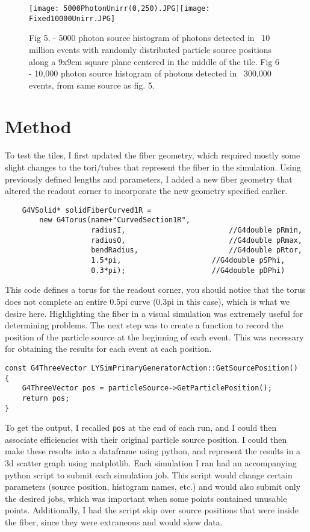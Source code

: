 \documentclass[11pt,twoside,a4paper,dn,final]{cms-tdr}
\begin{document}
\begin{figure}[h!]
  \begin{center}
    \texttt{[image: 5000PhotonUnirr(0,250).JPG]}\hspace{1cm}\texttt{[image: Fixed10000Unirr.JPG]}
    \hspace{1cm}
    \caption{Fig 5. - 5000 photon source histogram of photons detected in ~10 million events with randomly distributed particle source positions along a 9x9cm square plane centered in the middle of the tile.  Fig 6 - 10,000 photon source histogram of photons detected in ~300,000 events, from same source as fig. 5.}
    \label{fig:5,6}
  \end{center}
\end{figure}


\section{Method}
	To test the tiles, I first updated the fiber geometry, which required mostly some slight changes to the tori/tubes that represent the fiber in the simulation. Using previously defined lengths and parameters, I added a new fiber geometry that altered the readout corner to incorporate the new geometry specified earlier. 
\begin{verbatim}
	G4VSolid* solidFiberCurved1R = 
        new G4Torus(name+"CurvedSection1R",
                    radiusI,                        //G4double pRmin,
                    radiusO,                        //G4double pRmax,
                    bendRadius,                     //G4double pRtor,
                    1.5*pi,       	            //G4double pSPhi,
                    0.3*pi);      	            //G4double pDPhi)
\end{verbatim}
This code defines a torus for the readout corner, you should notice that the torus does not complete an entire 0.5pi curve (0.3pi in this case), which is what we desire here. Highlighting the fiber in a visual simulation was extremely useful for determining problems.
	The next step was to create a function to record the position of the particle source at the beginning of each event. This was necessary for obtaining the results for each event at each position.
\begin{verbatim}
const G4ThreeVector LYSimPrimaryGeneratorAction::GetSourcePosition()
{
    G4ThreeVector pos = particleSource->GetParticlePosition();
    return pos;
}
\end{verbatim}
To get the output, I recalled \verb|pos| at the end of each run, and I could then associate efficiencies with their original particle source position. I could then make these results into a dataframe using python, and represent the results in a 3d scatter graph using matplotlib. Each simulation I ran had an accompanying python script to submit each simulation job. This script would change certain parameters (source position, histogram names, etc.) and would also submit only the desired jobs, which was important when some points contained unusable points. Additionally, I had the script skip over source positions that were inside the fiber, since they were extraneous and would skew data. 
\end{document}
